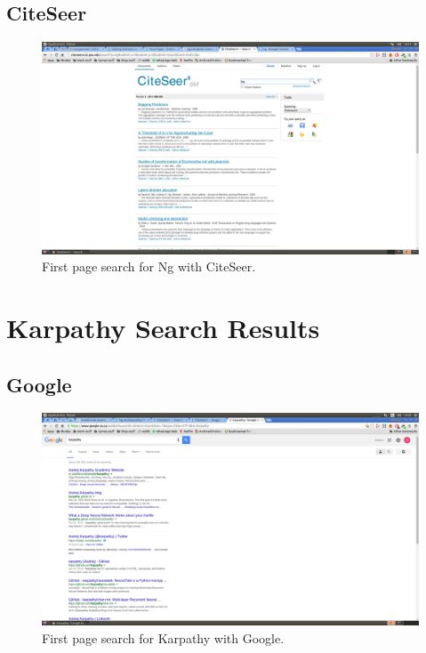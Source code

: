 \documentclass[a4paper]{article}
\begin{document}
\subsection{CiteSeer}
\begin{figure}[H]
\centering
\includegraphics[width=1.0\textwidth]{ng-citeseer.png}
\caption{\label{fig:ngc}First page search for Ng with CiteSeer.}
\end{figure}

\section{Karpathy Search Results}
\subsection{Google}
\begin{figure}[H]
\centering
\includegraphics[width=1.0\textwidth]{kp-google.png}
\caption{\label{fig:kpg}First page search for Karpathy with Google.}
\end{figure}
\end{document}
